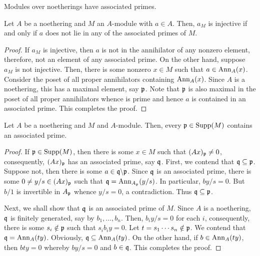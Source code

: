 \begin{corollary}
    Modules over noetherings have associated primes.
\end{corollary}

\begin{lemma}
    Let $A$ be a noethering and $M$ an $A$-module with $a\in A$. Then, $a_M$ is injective if and only if $a$ does not lie in any of the associated primes of $M$.
\end{lemma}
\begin{proof}
    If $a_M$ is injective, then $a$ is not in the annihilator of any nonzero element, therefore, not an element of any associated prime. On the other hand, suppose $a_M$ is not injective. Then, there is some nonzero $x\in M$ such that $a\in\operatorname{Ann}_A(x)$. Consider the poset of all proper annihilators containing $\operatorname{Ann}_A(x)$. Since $A$ is a noethering, this has a maximal element, say $\mathfrak p$. Note that $\mathfrak p$ is also maximal in the poset of all proper annihilators whence is prime and hence $a$ is contained in an associated prime. This completes the proof.
\end{proof}

\begin{lemma}
    Let $A$ be a noethering and $M$ and $A$-module. Then, every $\mathfrak p\in\operatorname{Supp}(M)$ contains an associated prime.
\end{lemma}
\begin{proof}
    If $\mathfrak p\in\operatorname{Supp}(M)$, then there is some $x\in M$ such that $(Ax)_\mathfrak p\ne0$, consequently, $(Ax)_\mathfrak p$ has an associated prime, say $\mathfrak q$. First, we contend that $\mathfrak q\subseteq\mathfrak p$. Suppose not, then there is some $a\in\mathfrak q\backslash\mathfrak p$. Since $\mathfrak q$ is an associated prime, there is some $0\ne y/s\in (Ax)_\mathfrak p$ such that $\mathfrak q = \operatorname{Ann}_{A_\mathfrak p}(y/s)$. In particular, $by/s = 0$. But $b/1$ is invertible in $A_\mathfrak p$ whence $y/s = 0$, a contradiction. Thus $\mathfrak q\subseteq\mathfrak p$.

    Next, we shall show that $\mathfrak q$ is an associated prime of $M$. Since $A$ is a noethering, $\mathfrak q$ is finitely generated, say by $b_1,\dots,b_n$. Then, $b_iy/s = 0$ for each $i$, consequently, there is some $s_i\notin\mathfrak p$ such that $s_ib_iy = 0$. Let $t = s_1\cdots s_n\notin\mathfrak p$. We contend that $\mathfrak q = \operatorname{Ann}_A(ty)$. Obviously, $\mathfrak q\subseteq\operatorname{Ann}_A(ty)$. On the other hand, if $b\in\operatorname{Ann}_A(ty)$, then $bty = 0$ whereby $by/s = 0$ and $b\in\mathfrak q$. This completes the proof.
\end{proof}


